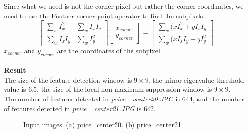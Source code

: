 \documentclass{../../assignment}
\begin{document}
\begin{problemlist}
\begin{enumerate}
Since what we need is not the corner pixel but rather the corner coordinates, we need to use the $\mathrm{F\ddot{o}stner}$ corner point operator to find the subpixels.
\[
\begin{bmatrix}
\sum_w I_x^2 &  \sum_w I_x I_y\\
\sum_w I_x I_y & \sum_w I_y^2
\end{bmatrix}
\begin{bmatrix}
x_{corner}\\
y_{corner}
\end{bmatrix}
=
\begin{bmatrix}
\sum_w (x I_x^2 + y I_x I_y\\
\sum_w (x I_x I_y + y I_y^2
\end{bmatrix}
\]
$x_{corner}$ and $y_{corner}$ are the coordinates of the subpixel.
\\\\
\textbf{Result}\\
The size of the feature detection window is $9\times9$, 
the minor eigenvalue threshold value is 6.5, 
the size of the local non-maximum suppression window is $9\times9$.\\
The number of features detected in \emph{price\_ center20.JPG} is 644, and the number of features detected in \emph{price\_ center21.JPG} is 642.
\begin{figure}[H]
\caption{Input images. (a) price\_center20. (b) price\_center21.}
\label{fig:images}
\end{figure}
 

\end{enumerate}
\end{problemlist}
\end{document}
